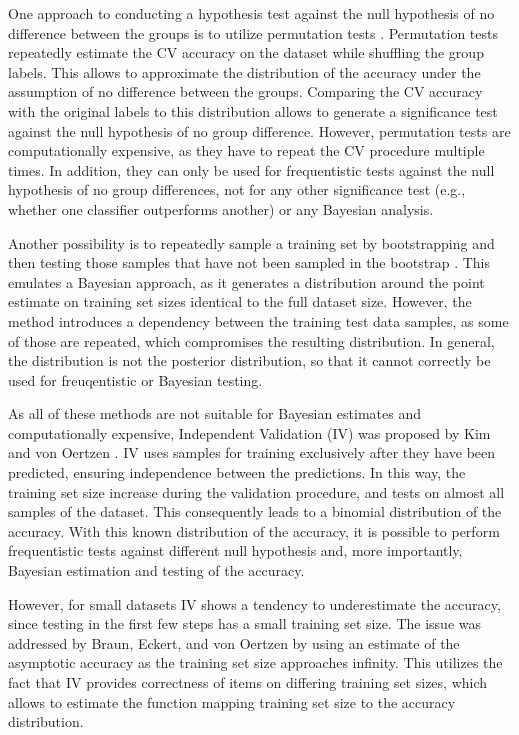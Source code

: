 \documentclass[article]{jss}
\begin{document}
One approach to conducting a hypothesis test against the null hypothesis of no difference between the groups is to utilize permutation tests \citep{pesarin_permutation_2010}. Permutation tests repeatedly estimate the CV accuracy on the dataset while shuffling the group labels. This allows to approximate the distribution of the accuracy under the assumption of no difference between the groups. Comparing the CV accuracy with the original labels to this distribution allows to generate a significance test against the null hypothesis of no group difference. However, permutation tests are computationally expensive, as they have to repeat the CV procedure multiple times. In addition, they can only be used for frequentistic tests against the null hypothesis of no group differences, not for any other significance test (e.g., whether one classifier outperforms another) or any Bayesian analysis.

Another possibility is to repeatedly sample a training set by bootstrapping and then testing those samples that have not been sampled in the bootstrap \citep{kohavi_study_1995}. This emulates a Bayesian approach, as it generates a distribution around the point estimate on training set sizes identical to the full dataset size. However, the method introduces a dependency between the training test data samples, as some of those are repeated, which compromises the resulting distribution. In general, the distribution is not the posterior distribution, so that it cannot correctly be used for freuqentistic or Bayesian testing.

As all of these methods are not suitable for Bayesian estimates and computationally expensive, Independent Validation (IV) was proposed by Kim and von Oertzen \citep{kim_classifiers_2018}. IV uses samples for training exclusively after they have been predicted, ensuring independence between the predictions. In this way, the training set size increase during the validation procedure, and tests on almost all samples of the dataset. This consequently leads to a binomial distribution of the accuracy. With this known distribution of the accuracy, it is possible to perform frequentistic tests against different null hypothesis and, more importantly, Bayesian estimation and testing of the accuracy.

However, for small datasets IV shows a tendency to underestimate the accuracy, since testing in the first few steps has a small training set size. The issue was addressed by Braun, Eckert, and von Oertzen \citep{braun_independent_2023} by using an estimate of the asymptotic accuracy as the training set size approaches infinity. This utilizes the fact that IV provides correctness of items on differing training set sizes, which allows to estimate the function mapping training set size to the accuracy distribution.
\end{document}
